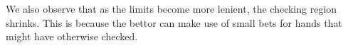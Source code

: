 \documentclass[a4paper,12pt]{article}
\theoremstyle{plain}
\theoremstyle{definition}
\begin{document}
We also observe that as the limits become more lenient, the checking region shrinks. This is because the bettor can make use of small bets for hands that might have otherwise checked. 







\end{document}
